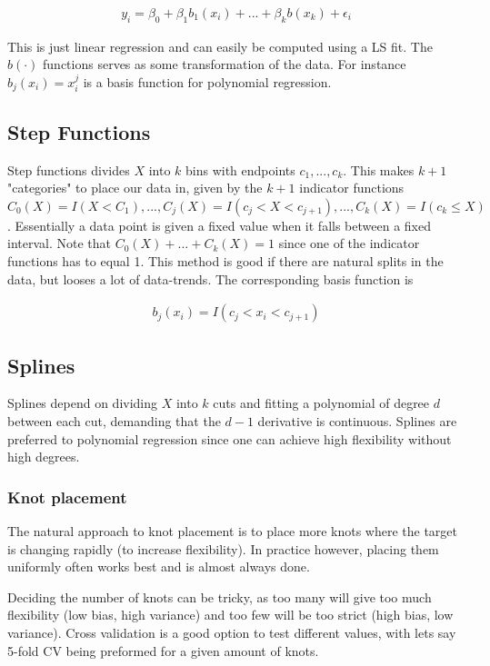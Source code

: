 \documentclass{article}
\begin{document}
\begin{align*}
    y_i = \beta_0 + \beta_1 b_1(x_i) + ... + \beta_k b(x_k) + \epsilon_i
\end{align*}

This is just linear regression and can easily be computed using a LS fit. The $b(\cdot)$ functions serves as some transformation of the data. For instance $b_j(x_i) = x_i^j$ is a basis function for polynomial regression. 

\subsection{Step Functions}
Step functions divides $X$ into $k$ bins with endpoints $c_1, ... , c_k$. This makes $k+1$ "categories" to place our data in, given by the $k+1$ indicator functions $C_0(X) = I(X < C_1), ..., C_j(X) = I(c_{j} < X < c_{j+1}), ... , C_k(X) = I(c_{k} \leq X)$. Essentially a data point is given a fixed value when it falls between a fixed interval. Note that $C_0(X) + ... + C_k(X) = 1$ since one of the indicator functions has to equal 1. This method is good if there are natural splits in the data, but looses a lot of data-trends. The corresponding basis function is 

\begin{align*}
    b_j(x_i) = I(c_j < x_i < c_{j+1})
\end{align*}

\subsection{Splines}
Splines depend on dividing $X$ into $k$ cuts and fitting a polynomial of degree $d$ between each cut, demanding that the $d-1$ derivative is continuous. Splines are preferred to polynomial regression since one can achieve high flexibility without high degrees.  

\subsubsection{Knot placement}

The natural approach to knot placement is to place more knots where the target is changing rapidly (to increase flexibility). In practice however, placing them uniformly often works best and is almost always done. 

Deciding the number of knots can be tricky, as too many will give too much flexibility (low bias, high variance) and too few will be too strict (high bias, low variance). Cross validation is a good option to test different values, with lets say 5-fold CV being preformed for a given amount of knots. 
\end{document}
